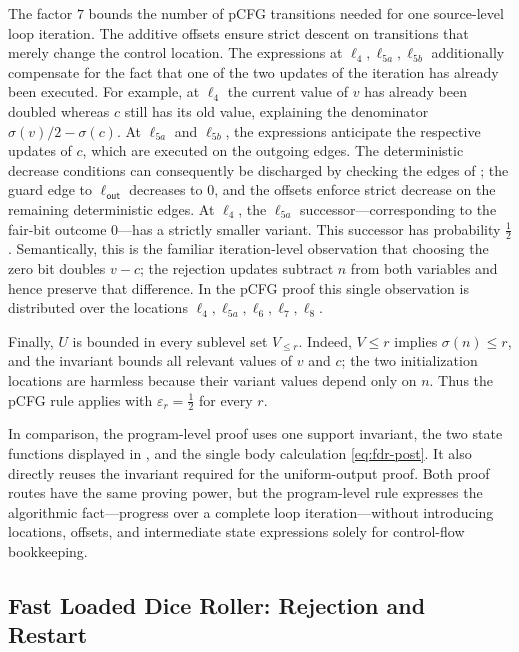 The factor $7$ bounds the number of pCFG transitions needed for one source-level
loop iteration.  The additive offsets ensure strict descent on transitions
that merely change the control location.  The expressions at
$\ell_4,\ell_{5a},\ell_{5b}$ additionally compensate for the fact that one of
the two updates of the iteration has already been executed.  For example,
at $\ell_4$ the current value of $v$ has already been doubled whereas $c$
still has its old value, explaining the denominator
$\sigma(v)/2-\sigma(c)$.  At $\ell_{5a}$ and $\ell_{5b}$, the expressions anticipate the
respective updates of $c$, which are executed on the outgoing edges.
The deterministic decrease conditions can consequently be discharged by
checking the edges of ; the guard edge to
$\ell_{\mathsf{out}}$ decreases to $0$, and the offsets enforce strict
decrease on the remaining deterministic edges.  At $\ell_4$, the
$\ell_{5a}$ successor---corresponding to the fair-bit outcome $0$---has a
strictly smaller variant.  This successor has probability $\frac12$.
Semantically, this is the familiar iteration-level observation that choosing
the zero bit doubles $v-c$; the rejection updates subtract $n$ from both
variables and hence preserve that difference.  In the pCFG proof this single
observation is distributed over the locations
$\ell_4,\ell_{5a},\ell_6,\ell_7,\ell_8$.

Finally, $U$ is bounded in every sublevel set $V_{\leq r}$.  Indeed,
$V\leq r$ implies $\sigma(n)\leq r$, and the invariant bounds all relevant
values of $v$ and $c$; the two initialization locations are harmless because
their variant values depend only on $n$.  Thus the pCFG rule applies with
$\varepsilon_r=\frac12$ for every $r$.

In comparison, the program-level proof uses one support invariant, the two
state functions displayed in , and the single body calculation
\eqref{eq:fdr-post}.  It also directly reuses the invariant required for the
uniform-output proof.  Both proof routes have the same proving power, but the
program-level rule expresses the algorithmic fact---progress over a complete
loop iteration---without introducing locations, offsets, and intermediate
state expressions solely for control-flow bookkeeping.


\subsection{Fast Loaded Dice Roller: Rejection and Restart}
\label{sec:fldr}

